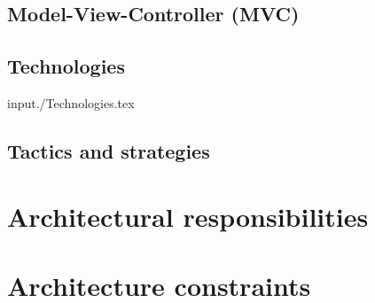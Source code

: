 \documentclass[a4paper,12pt,titlepage]{article}
\begin{document}
	\subsection{Model-View-Controller (MVC)}
	
	
	\subsection{Technologies}
	input{./Technologies.tex}
	
	\subsection{Tactics and strategies}
	
\section{Architectural responsibilities}
\section{Architecture constraints}

%
\end{document}
